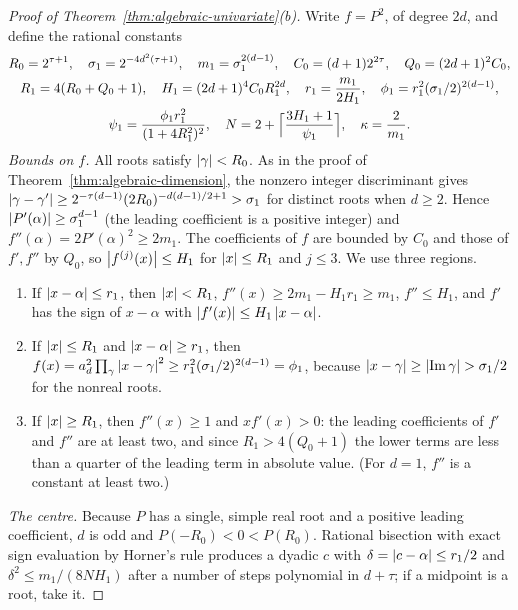 \begin{proof}[Proof of Theorem~\ref{thm:algebraic-univariate}(b)]
Write $f=P^2$, of degree $2d$, and define the rational constants
\[
\begin{gathered}
 R_0=2^{\tau+1},\quad \sigma_1=2^{-4d^2(\tau+1)},\quad
 m_1=\sigma_1^{2(d-1)},\quad C_0=(d+1)2^{2\tau},\quad
 Q_0=(2d+1)^2C_0,\\
 R_1=4(R_0+Q_0+1),\quad H_1=(2d+1)^4C_0R_1^{2d},\quad
 r_1=\frac{m_1}{2H_1},\quad \phi_1=r_1^2(\sigma_1/2)^{2(d-1)},\\
 \psi_1=\frac{\phi_1r_1^2}{(1+4R_1^2)^2},\quad
 N=2+\Bigl\lceil\frac{3H_1+1}{\psi_1}\Bigr\rceil,\quad \kappa=\frac2{m_1}.
\end{gathered}
\]
\emph{Bounds on $f$.} All roots satisfy $\left\lvert\gamma\right\rvert<R_0$. As in the proof of
Theorem~\ref{thm:algebraic-dimension}, the nonzero integer discriminant gives
$\left\lvert\gamma-\gamma'\right\rvert\ge2^{-\tau(d-1)}(2R_0)^{-d(d-1)/2+1}>\sigma_1$ for distinct
roots when $d\ge2$. Hence $\left\lvert P'(\alpha)\right\rvert\ge\sigma_1^{d-1}$ (the leading
coefficient is a positive integer) and $f''(\alpha)=2P'(\alpha)^2\ge2m_1$. The
coefficients of $f$ are bounded by $C_0$ and those of $f',f''$ by $Q_0$, so
$\left\lvert f^{(j)}(x)\right\rvert\le H_1$ for $\left\lvert x\right\rvert\le R_1$ and $j\le3$. We use three regions.
\begin{enumerate}[label=(\Roman*)]
\item If $\left\lvert x-\alpha\right\rvert\le r_1$, then $\left\lvert x\right\rvert<R_1$, $f''(x)\ge2m_1-H_1r_1\ge
  m_1$, $f''\le H_1$, and $f'$ has the sign of $x-\alpha$ with
  $\left\lvert f'(x)\right\rvert\le H_1\left\lvert x-\alpha\right\rvert$.
\item If $\left\lvert x\right\rvert\le R_1$ and $\left\lvert x-\alpha\right\rvert\ge r_1$, then
  $f(x)=a_d^2\prod_\gamma\left\lvert x-\gamma\right\rvert^2\ge r_1^2(\sigma_1/2)^{2(d-1)}=\phi_1$,
  because $\left\lvert x-\gamma\right\rvert\ge\left\lvert\operatorname{Im}\gamma\right\rvert>\sigma_1/2$ for the
  nonreal roots.
\item If $\left\lvert x\right\rvert\ge R_1$, then $f''(x)\ge1$ and $xf'(x)>0$: the leading
  coefficients of $f'$ and $f''$ are at least two, and since $R_1>4(Q_0+1)$
  the lower terms are less than a quarter of the leading term in absolute
  value. (For $d=1$, $f''$ is a constant at least two.)
\end{enumerate}
\emph{The centre.} Because $P$ has a single, simple real root and a positive
leading coefficient, $d$ is odd and $P(-R_0)<0<P(R_0)$. Rational bisection
with exact sign evaluation by Horner's rule produces a dyadic $c$ with
$\delta=\left\lvert c-\alpha\right\rvert\le r_1/2$ and $\delta^2\le m_1/(8NH_1)$ after a number of
steps polynomial in $d+\tau$; if a midpoint is a root, take it.


\end{proof}
